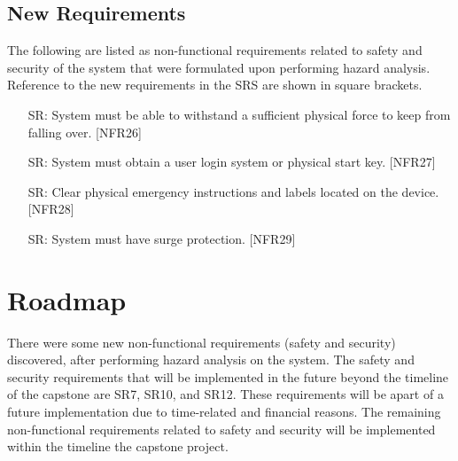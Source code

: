 \documentclass{article}
\newcounter{srreqnum} %
\begin{document}
\subsection{New Requirements}
The following are listed as non-functional requirements related to 
safety and security of the system that were formulated upon performing 
hazard analysis. Reference to the new requirements in the SRS are shown in square brackets.\\

\begin{itemize}
    \item[SR\refstepcounter{srreqnum}\thesrreqnum \label{SR9}:]
    System must be able to withstand a sufficient physical force to keep from falling over. [NFR26]
    \item[SR\refstepcounter{srreqnum}\thesrreqnum \label{SR10}:]
    System must obtain a user login system or physical start key. [NFR27]
    \item[SR\refstepcounter{srreqnum}\thesrreqnum \label{SR11}:]
    Clear physical emergency instructions and labels located on the device. [NFR28]
    \item[SR\refstepcounter{srreqnum}\thesrreqnum \label{SR12}:]
    System must have surge protection. [NFR29]
\end{itemize}

\section{Roadmap}

There were some new non-functional requirements (safety and security) discovered, 
after performing hazard analysis on the system. The safety and security requirements 
that will be implemented in the future beyond the timeline of the capstone are SR7, 
SR10, and SR12. These requirements will be apart of a future implementation due to 
time-related and financial reasons. The remaining non-functional requirements related 
to safety and security will be implemented within the timeline the capstone project.
\end{document}
